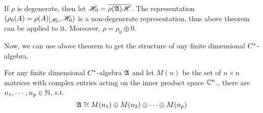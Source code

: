 \begin{rem}
	If $\rho$ is degenerate, then let $\mathscr{H}_0 = \overline{\rho(\mathfrak{A}) \mathscr{H}}$. The representation $(\rho_0(A) = \rho(A)|_{\mathscr{H}_0}, \mathscr{H}_0)$ is a non-degenerate representation, thus above theorem can be applied to it. Moreover, $\rho = \rho_0 \oplus 0$. 
\end{rem}

Now, we can use above theorem to get the structure of any finite dimensional $C^{*}$-algebra.
\begin{cor}
	For any finite dimensional $C^{*}$-algebra $\mathfrak{A}$ and let $M(n)$ be the set of $n \times n$ matrices with complex entries acting on the inner product space $\mathbb{C}^{n}$., there are $n_1,\cdots,n_p \in \mathbb{N}$, s.t.
	\begin{equation*}
		\mathfrak{A} \cong M(n_1) \oplus M(n_2) \oplus \cdots \oplus M(n_p)
	\end{equation*}
\end{cor}

